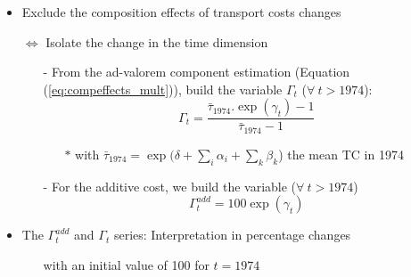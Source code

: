 \documentclass[10 pt,Helvetica, french]{beamer}
\begin{document}
\begin{frame}[label = slide_compeffects]
\begin{itemize}
\item Exclude the composition effects of transport costs changes  \hyperlink{app_compeffects}{}\vspace{0.1cm}
\item[$\Leftrightarrow$] Isolate the change in the time dimension  \vspace{0.1cm}
\begin{itemize}
\item[-] From the ad-valorem component estimation (Equation (\ref{eq:compeffects_mult})), build the variable $\Gamma_t$ ($\forall~t > 1974$):
\begin{equation*}
 \Gamma_t= \frac {\bar{\tau}_{1974}.\exp(\gamma_t)-1} {\bar{\tau}_{1974}-1}
\end{equation*}
\begin{itemize}
\item[$\ast$] with $\bar{\tau}_{1974} = \exp(\delta+\sum_i \alpha_i + \sum_k \beta_k$) the mean TC in 1974
\end{itemize}
\item[-] For the additive cost, we build the variable ($\forall~t > 1974$)
$$\Gamma^{add}_t = 100 \exp(\gamma_t)$$
\end{itemize}
\item The $\Gamma^{add}_t$ and $\Gamma_t$ series: Interpretation in percentage changes
\begin{itemize}
\item[] with an initial value of 100 for $t=1974$
\end{itemize}
\end{itemize}

\end{frame}
\end{document}

